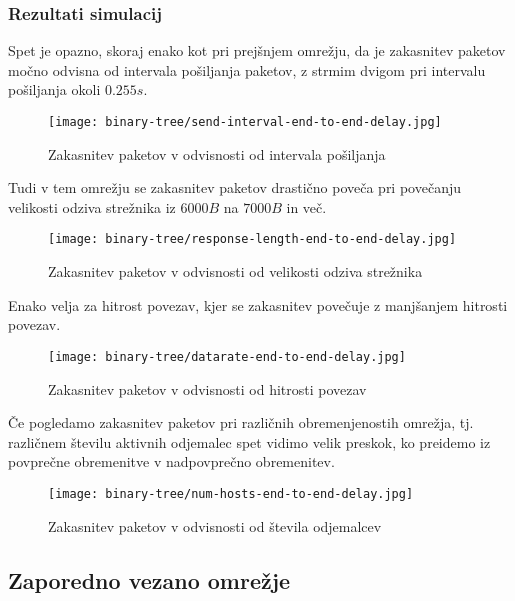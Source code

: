 \subsubsection{Rezultati simulacij}

Spet je opazno, skoraj enako kot pri prejšnjem omrežju, da je zakasnitev paketov močno odvisna od intervala pošiljanja paketov, z strmim dvigom pri intervalu pošiljanja okoli $0.255s$.

\begin{figure}[H]
    \centering
    \texttt{[image: binary-tree/send-interval-end-to-end-delay.jpg]}
    \caption{Zakasnitev paketov v odvisnosti od intervala pošiljanja}
    \label{fig:send-interval-end-to-end-delay-binary-tree}
\end{figure}

Tudi v tem omrežju se zakasnitev paketov drastično poveča pri povečanju velikosti odziva strežnika iz $6000B$ na $7000B$ in več.

\begin{figure}[H]
    \centering
    \texttt{[image: binary-tree/response-length-end-to-end-delay.jpg]}
    \caption{Zakasnitev paketov v odvisnosti od velikosti odziva strežnika}
    \label{fig:response-length-end-to-end-delay-binary-tree}
\end{figure}

Enako velja za hitrost povezav, kjer se zakasnitev povečuje z manjšanjem hitrosti povezav.

\begin{figure}[H]
    \centering
    \texttt{[image: binary-tree/datarate-end-to-end-delay.jpg]}
    \caption{Zakasnitev paketov v odvisnosti od hitrosti povezav}
    \label{fig:datarate-end-to-end-delay-binary-tree}
\end{figure}

Če pogledamo zakasnitev paketov pri različnih obremenjenostih omrežja, tj. različnem številu aktivnih odjemalec spet vidimo velik preskok, ko preidemo iz povprečne obremenitve v nadpovprečno obremenitev.

\begin{figure}[H]
    \centering
    \texttt{[image: binary-tree/num-hosts-end-to-end-delay.jpg]}
    \caption{Zakasnitev paketov v odvisnosti od števila odjemalcev}
    \label{fig:num-hosts-end-to-end-delay-binary-tree}
\end{figure}

\subsection{Zaporedno vezano omrežje}

